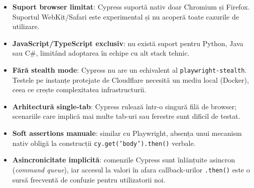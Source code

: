\begin{itemize}
    \item \textbf{Suport browser limitat}: Cypress suportă nativ doar Chromium și Firefox.
          Suportul WebKit/Safari este experimental și nu acoperă toate cazurile de utilizare.
    \item \textbf{JavaScript/TypeScript exclusiv}: nu există suport pentru Python, Java sau C\#,
          limitând adoptarea în echipe cu alt stack tehnic.
    \item \textbf{Fără stealth mode}: Cypress nu are un echivalent al \texttt{playwright-stealth}.
          Testele pe instanțe protejate de Cloudflare necesită un mediu local (Docker), ceea
          ce crește complexitatea infrastructurii.
    \item \textbf{Arhitectură single-tab}: Cypress rulează într-o singură filă de browser;
          scenariile care implică mai multe tab-uri sau ferestre sunt dificil de testat.
    \item \textbf{Soft assertions manuale}: similar cu Playwright, absența unui mecanism nativ
          obligă la construcții \texttt{cy.get('body').then()} verbale.
    \item \textbf{Asincronicitate implicită}: comenzile Cypress sunt înlănțuite asincron
          (\textit{command queue}), iar accesul la valori în afara callback-urilor
          \texttt{.then()} este o sursă frecventă de confuzie pentru utilizatorii noi.
\end{itemize}
